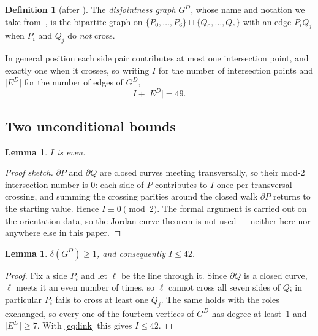 \documentclass[11pt,a4paper]{article}
\theoremstyle{plain}
\newtheorem{lemma}[theorem]{Lemma}
\theoremstyle{definition}
\newtheorem{definition}[theorem]{Definition}
\theoremstyle{remark}
\newcommand{\GD}{G^{D}}
\newcommand{\ED}{E^{D}}
\begin{document}
\begin{definition}[after \cite{AckermanKeszeghRote2022}]
The \emph{disjointness graph} $\GD$, whose name and notation we take
from~\cite{AckermanKeszeghRote2022}, is the bipartite graph on
$\{P_0,\dots,P_6\}\sqcup\{Q_0,\dots,Q_6\}$ with an edge $P_iQ_j$ when $P_i$ and
$Q_j$ do \emph{not} cross.
\end{definition}

In general position each side pair contributes at most one intersection point,
and exactly one when it crosses, so writing $I$ for the number of intersection
points and $\lvert \ED\rvert$ for the number of edges of $\GD$,
\begin{equation}\label{eq:link}
  I + \lvert \ED\rvert = 49 .
\end{equation}

\subsection{Two unconditional bounds}

\begin{lemma}\label{lem:even}
$I$ is even.
\end{lemma}

\begin{proof}[Proof sketch]
$\partial P$ and $\partial Q$ are closed curves meeting transversally, so their
mod-$2$ intersection number is $0$: each side of $P$ contributes to $I$ once per
transversal crossing, and summing the crossing parities around the closed walk
$\partial P$ returns to the starting value. Hence $I\equiv 0 \pmod 2$. The
formal argument is carried out on the orientation data, so the Jordan curve
theorem is not used --- neither here nor anywhere else in this paper.
\end{proof}

\begin{lemma}\label{lem:42}
$\delta(\GD)\ge 1$, and consequently $I\le 42$.
\end{lemma}

\begin{proof}
Fix a side $P_i$ and let $\ell$ be the line through it. Since $\partial Q$ is a
closed curve, $\ell$ meets it an even number of times, so $\ell$ cannot cross
all seven sides of $Q$; in particular $P_i$ fails to cross at least one $Q_j$.
The same holds with the roles exchanged, so every one of the fourteen vertices
of $\GD$ has degree at least~$1$ and $\lvert \ED\rvert\ge 7$. With
\eqref{eq:link} this gives $I\le 42$.
\end{proof}
\end{document}
